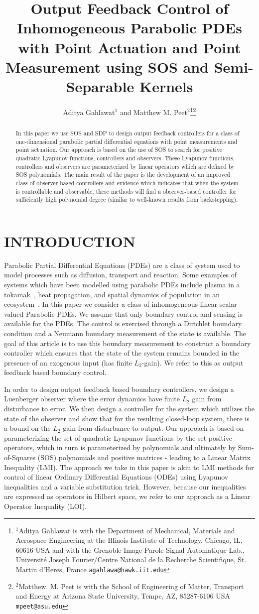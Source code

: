\documentclass[US letter, 9 pt, conference]{ieeeconf}  \usepackage{setspace}
\title{\LARGE \bf
Output Feedback Control of Inhomogeneous Parabolic PDEs with Point Actuation and Point Measurement using SOS and Semi-Separable Kernels
}
\author{Aditya Gahlawat$^{1}$ and Matthew M. Peet$^{2}$\thanks{$^{1}$Aditya Gahlawat is with the Department
of Mechanical, Materials and Aerospace Engineering at the Illinois Institute of Technology, Chicago,
IL, 60616 USA and with the Grenoble Image Parole Signal Automatique Lab., Universit\'{e} Joseph Fourier/Centre National de la Recherche Scientifique, St. Martin d'Heres, France
        {\tt\small agahlawa@hawk.iit.edu}}\thanks{$^{2}$Matthew. M. Peet is with the School of Engineering of Matter, Transport and Energy at Arizona State University, Tempe, AZ, 85287-6106 USA
        {\tt\small mpeet@asu.edu}}}
\begin{document}
\maketitle
\thispagestyle{empty}
\pagestyle{empty}


\begin{abstract}
In this paper we use SOS and SDP to design output feedback controllers for a class of one-dimensional parabolic partial differential equations with point measurements and point actuation. Our approach is based on the use of SOS to search for positive quadratic Lyapunov functions, controllers and observers. These Lyapunov functions, controllers and observers are parameterized by linear operators which are defined by SOS polynomials. The main result of the paper is the development of an improved class of observer-based controllers and evidence which indicates that when the system is controllable and observable, these methods will find a observer-based controller for sufficiently high polynomial degree (similar to well-known results from backstepping).
\end{abstract}


\section{INTRODUCTION}

Parabolic Partial Differential Equations (PDEs) are a class of system used to model processes such as diffusion, transport and reaction.  Some examples of systems which have been modelled using parabolic PDEs include plasma in a tokamak~\cite{witrant2007control}, heat propagation, and spatial dynamics of population in an ecosystem~\cite{murray2002mathematical}. In this paper we consider a class of inhomogeneous linear scalar valued Parabolic PDEs. We assume that only boundary control and sensing is available for the PDEs. The control is exercised through a Dirichlet boundary condition and a Neumann boundary measurement of the state is available. The goal of this article is to use this boundary measurement to construct a boundary controller which ensures that the state of the system remains bounded in the presence of an exogenous input (has finite $L_2$-gain). We refer to this as output feedback based boundary control.

In order to design output feedback based boundary controllers, we design a Luenberger observer where the error dynamics have finite $L_2$ gain from disturbance to error. We then design a controller for the system which utilizes the state of the observer and show that for the resulting closed-loop system, there is a bound on the $L_2$ gain from disturbance to output. Our approach is based on parameterizing the set of quadratic Lyapunov functions by the set positive operators, which in turn is parameterized by polynomials and ultimately by Sum-of-Squares (SOS) polynomials and positive matrices - leading to a Linear Matrix Inequality (LMI). The approach we take in this paper is akin to LMI methods for control of linear Ordinary Differential Equations (ODEs) using Lyapunov inequalities and a variable substitution trick. However, because our inequalities are expressed as operators in Hilbert space, we refer to our approach as a Linear Operator Inequality (LOI).
\end{document}
